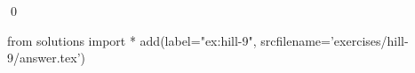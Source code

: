 
\begin{ex} 
  \label{ex:hill-9}
  
  \qed
\end{ex} 
\begin{python0}
from solutions import *
add(label="ex:hill-9",
    srcfilename='exercises/hill-9/answer.tex') 
\end{python0}
